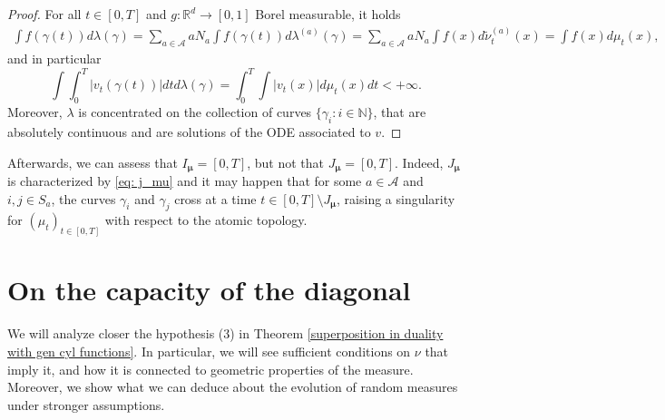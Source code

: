 \documentclass[10pt,leqno]{amsart}
\numberwithin{equation}{section}
\newcommand{\R}{\mathbb{R}}
\newcommand{\N}{\mathbb{N}}
\begin{document}
\begin{proof}
    For all $t\in[0,T]$ and $g:\R^d\to [0,1] $ Borel measurable, it holds
    \begin{align*}
        \int f(\gamma(t)) d\lambda(\gamma) = \sum_{a\in \mathcal{A}} aN_a \int f(\gamma(t)) d\lambda^{(a)}(\gamma) = \sum_{a\in \mathcal{A}} a N_a \int f(x) d\tilde{\nu}_t^{(a)}(x) = \int f(x)d\mu_t(x),
    \end{align*}
    and in particular
    \[\int \int_0^T |v_t(\gamma(t))| dt d\lambda(\gamma) = \int_0^T \int | v_t(x)| d\mu_t(x) dt <+\infty.\]
    Moreover, $\lambda$ is concentrated on the collection of curves $\{\gamma_i : i\in \N\}$, that are absolutely continuous and are solutions of the ODE associated to $v$.    %
\end{proof}


Afterwards, we can assess that $I_{\boldsymbol{\mu}} = [0,T]$, but not that $J_{\boldsymbol{\mu}} =[0,T]$. Indeed, $J_{\boldsymbol{\mu}}$ is characterized by \eqref{eq: j_mu} and it may happen that for some $a\in \mathcal{A}$ and $i,j\in S_a$, the curves $\gamma_i$ and $\gamma_j$ cross at a time $t\in[0,T]\setminus J_{\boldsymbol{\mu}}$, raising a singularity for $(\mu_t)_{t\in[0,T]}$ with respect to the atomic topology. 




























\section{On the capacity of the diagonal}\label{section: capacity}
We will analyze closer the hypothesis (3) in Theorem \ref{superposition in duality with gen cyl functions}. In particular, we will see sufficient conditions on $\nu$ that imply it, and how it is connected to geometric properties of the measure. Moreover, we show what we can deduce about the evolution of random measures under stronger assumptions.
\end{document}

